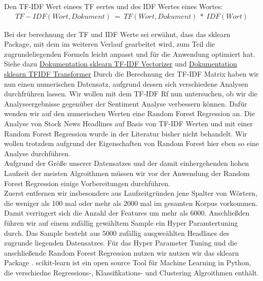 Den TF-IDF Wert einees TF eertes und des IDF Wertes eines Wortes:
\begin{align}
    TF-IDF(Wort, Dokument) \: = \: TF(Wort, Dokument)\: {*}\: IDF(Wort)
\end{align}

Bei der berechnung der TF und IDF Werte sei erwähnt, dass das sklearn Package, mit dem im weiteren Verlauf gearbeitet wird, zum Teil die zugrundeliegenden Formeln leicht anpasst und für die Anwendung optimiert hat. Siehe dazu \href{https://scikit-learn.org/stable/modules/feature_extraction.html#tfidf-term-weighting}{Dokumentation sklearn TF-IDF Vectorizer} und \href{https://scikit-learn.org/stable/modules/generated/sklearn.feature_extraction.text.TfidfTransformer.html#sklearn-feature-extraction-text-tfidftransformer}{ Dokumentation sklearn TFIDF Transformer}
Durch die Berechnung der TF-IDF Matrix haben wir nun einen numerischen Datensatz, aufgrund dessen sich verschiedene Analysen durchfrühren lassen. Wir wollen mit dem TF-IDF Rf nun untersuchen, ob wir die Analyseergebnisse gegenüber der Sentiment Analyse verbessern können. Dafür wenden wir auf den numerischen Werten eine Random Forest Regression an. Die Analyse von Stock News Headlines auf Basis von TF-IDF Werten und mit einer Random Forest Regression wurde in der Literatur bisher nicht behandelt. Wir wollen trotzdem aufgrund der Eigenschaften von Random Forest hier eben so eine Analyse durchführen.\\
Aufgrund der Größe unserer Datensatzes und der damit einhergehenden hohen Laufzeit der meisten Algroithmen müssen wir vor der Anwendung der Random Forest Regression einige Vorbereitungen durchführen.\\
Zuerst entfernen wir insbesondere aus Laufzeitgründen jene Spalter von Wörtern, die weniger als 100 mal oder mehr als 2000 mal im gesamten Korpus vorkommen. Damit verringert sich die Anzahl der Features um mehr als 6000. Anschließden führen wir auf einem zufällig gewähltem Sample ein Hyper Paramtertuning durch. Das Sample besteht aus 5000 zufällig ausgweählten Headlines des zugrunde liegenden Datensatzes. Für das Hyper Parameter Tuning und die anschließende Random Forest Regression nutzen wir nutzen wir das sklearn Package \citep{sklearn}. scikit-learn ist ein open source Tool für Machine Learning in Python, die verschiedne Regressions-, Klassifikations- und Clustering Algroithmen enthält.

